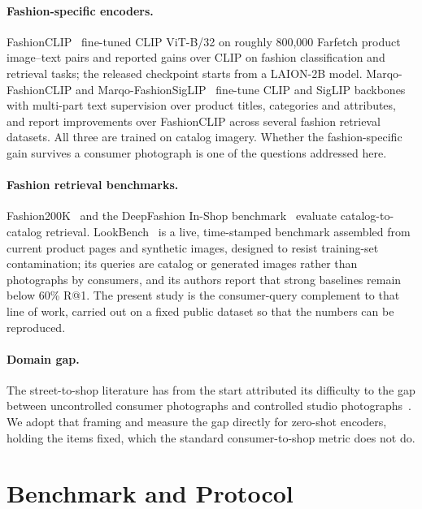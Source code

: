\documentclass[10pt,twocolumn,letterpaper]{article}
\makeatletter
\newcommand{\recall}[1]{R@#1}
\makeatother
\begin{document}
\paragraph{Fashion-specific encoders.}
FashionCLIP~\cite{chia2022fashionclip} fine-tuned CLIP ViT-B/32 on roughly 800,000 Farfetch product image--text pairs and reported gains over CLIP on fashion classification and retrieval tasks; the released checkpoint starts from a LAION-2B model. Marqo-FashionCLIP and Marqo-FashionSigLIP~\cite{marqo2024fashion} fine-tune CLIP and SigLIP backbones with multi-part text supervision over product titles, categories and attributes, and report improvements over FashionCLIP across several fashion retrieval datasets. All three are trained on catalog imagery. Whether the fashion-specific gain survives a consumer photograph is one of the questions addressed here.

\paragraph{Fashion retrieval benchmarks.}
Fashion200K~\cite{han2017fashion200k} and the DeepFashion In-Shop benchmark~\cite{liu2016deepfashion} evaluate catalog-to-catalog retrieval. LookBench~\cite{gao2026lookbench} is a live, time-stamped benchmark assembled from current product pages and synthetic images, designed to resist training-set contamination; its queries are catalog or generated images rather than photographs by consumers, and its authors report that strong baselines remain below 60\% \recall{1}. The present study is the consumer-query complement to that line of work, carried out on a fixed public dataset so that the numbers can be reproduced.

\paragraph{Domain gap.}
The street-to-shop literature has from the start attributed its difficulty to the gap between uncontrolled consumer photographs and controlled studio photographs~\cite{liu2012street,kiapour2015where}. We adopt that framing and measure the gap directly for zero-shot encoders, holding the items fixed, which the standard consumer-to-shop metric does not do.

\section{Benchmark and Protocol}
\label{sec:protocol}
\end{document}
